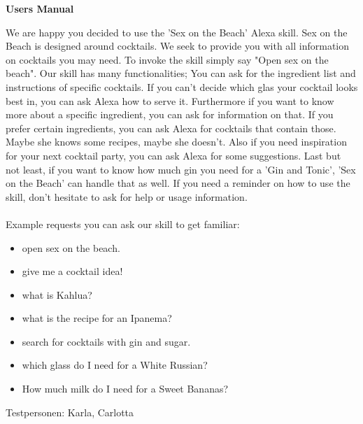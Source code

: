 \documentclass[12pt,letterpaper]{article}
\begin{document}
\begin{adjustwidth}{1cm}{1cm}
\textbf{Users Manual} 

We are happy you decided to use the 'Sex on the Beach' Alexa skill. Sex on the Beach is designed around cocktails. We seek to provide you with all information on cocktails you may need. To invoke the skill simply say "Open sex on the beach".
Our skill has many functionalities; You can ask for the ingredient list and instructions of specific cocktails. If you can’t decide which glas your cocktail looks best in, you can ask Alexa how to serve it. Furthermore if you want to know more about a specific ingredient, you can ask for information on that. If you prefer certain ingredients, you can ask Alexa for cocktails that contain those. Maybe she knows some recipes, maybe she doesn't. Also if you need inspiration for your next cocktail party, you can ask Alexa for some suggestions. Last but not least, if you want to know how much gin you need for a 'Gin and Tonic', 'Sex on the Beach' can handle that as well.
If you need a reminder on how to use the skill, don't hesitate to ask for help or usage information. \\ \\
Example requests you can ask our skill to get familiar:
\begin{itemize}

\item open sex on the beach.

\item give me a cocktail idea!

\item what is Kahlua?

\item what is the recipe for an Ipanema?

\item search for cocktails with gin and sugar.

\item which glass do I need for a White Russian?

\item How much milk do I need for a Sweet Bananas?
\end{itemize}

\end{adjustwidth}

Testpersonen:
    Karla, Carlotta
\end{document}
